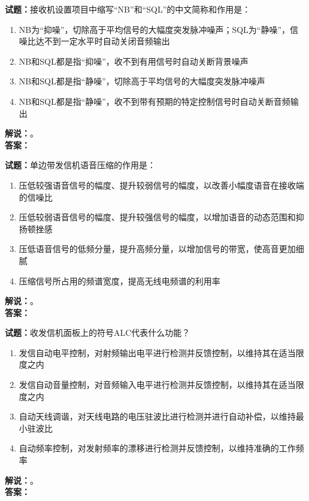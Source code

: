 \documentclass{ctexbook}
\begin{document}
\bigskip

\noindent\textbf{试题：}接收机设置项目中缩写“NB”和“SQL”的中文简称和作用是：
\begin{enumerate}[leftmargin=3em]
  \item NB为“抑噪”，切除高于平均信号的大幅度突发脉冲噪声；SQL为“静噪”，信噪比达不到一定水平时自动关闭音频输出
  \item NB和SQL都是指“抑噪”，收不到有用信号时自动关断背景噪声
  \item NB和SQL都是指“静噪”，切除高于平均信号的大幅度突发脉冲噪声
  \item NB和SQL都是指“静噪”，收不到带有预期的特定控制信号时自动关断音频输出
\end{enumerate}
\noindent\textbf{解说：}\textbf{}。\\\noindent\textbf{答案：}

\bigskip

\noindent\textbf{试题：}单边带发信机语音压缩的作用是：
\begin{enumerate}[leftmargin=3em]
  \item 压低较强语音信号的幅度、提升较弱信号的幅度，以改善小幅度语音在接收端的信噪比
  \item 压低较弱语音信号的幅度、提升较强信号的幅度，以增加语音的动态范围和抑扬顿挫感
  \item 压低语音信号的低频分量，提升高频分量，以增加信号的带宽，使高音更加细腻
  \item 压缩信号所占用的频谱宽度，提高无线电频谱的利用率
\end{enumerate}
\noindent\textbf{解说：}\textbf{}。\\\noindent\textbf{答案：}

\bigskip

\noindent\textbf{试题：}收发信机面板上的符号ALC代表什么功能？
\begin{enumerate}[leftmargin=3em]
  \item 发信自动电平控制，对射频输出电平进行检测并反馈控制，以维持其在适当限度之内
  \item 发信自动音量控制，对音频输入电平进行检测并反馈控制，以维持其在适当限度之内
  \item 自动天线调谐，对天线电路的电压驻波比进行检测并进行自动补偿，以维持最小驻波比
  \item 自动频率控制，对发射频率的漂移进行检测并反馈控制，以维持准确的工作频率
\end{enumerate}
\noindent\textbf{解说：}\textbf{}。\\\noindent\textbf{答案：}

\bigskip
\end{document}
